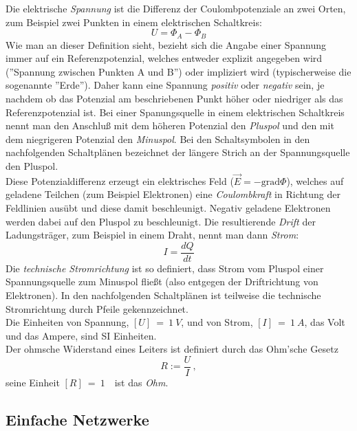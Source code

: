Die elektrische \textit{Spannung} ist die Differenz der Coulombpotenziale an zwei Orten, zum Beispiel zwei Punkten in einem elektrischen Schaltkreis:
\begin{equation}
	U = \Phi_A - \Phi_B
\end{equation}
Wie man an dieser Definition sieht, bezieht sich die Angabe einer Spannung immer auf ein Referenzpotenzial, welches entweder explizit angegeben wird (''Spannung zwischen Punkten A und B'') oder impliziert wird (typischerweise die sogenannte ''Erde''). Daher kann eine Spannung \textit{positiv} oder \textit{negativ} sein, je nachdem ob das Potenzial am beschriebenen Punkt höher oder niedriger als das Referenzpotenzial ist. Bei einer Spanungsquelle in einem elektrischen Schaltkreis nennt man den Anschluß mit dem höheren Potenzial den \textit{Pluspol} und den mit dem niegrigeren Potenzial den \textit{Minuspol}. Bei den Schaltsymbolen in den nachfolgenden Schaltplänen bezeichnet der längere Strich an der Spannungsquelle den Pluspol.\\
Diese Potenzialdifferenz erzeugt ein elektrisches Feld ($\vec{E} = -\mathrm{grad}\Phi$), welches auf geladene Teilchen (zum Beispiel Elektronen) eine \textit{Coulombkraft} in Richtung der Feldlinien ausübt und diese damit beschleunigt. Negativ geladene Elektronen werden dabei auf den Pluspol zu beschleunigt. Die resultierende \textit{Drift} der Ladungsträger, zum Beispiel in einem Draht, nennt man dann \textit{Strom}:
\begin{equation}
	I = \frac{dQ}{dt}
\end{equation}
Die \textit{technische Stromrichtung} ist so definiert, dass Strom vom Pluspol einer Spannungsquelle zum Minuspol fließt (also entgegen der Driftrichtung von Elektronen). In den nachfolgenden Schaltplänen ist teilweise die technische Stromrichtung durch Pfeile gekennzeichnet.\\

\noindent
Die Einheiten von Spannung, $[U]~=~1~V$, und von Strom, $[I]~=~1~A$, das Volt und das Ampere, sind SI Einheiten. \\

\noindent
Der ohmsche Widerstand eines Leiters ist definiert durch das Ohm'sche Gesetz
\begin{equation}
R:=\frac{U}{I}\, ,
\end{equation}
seine Einheit $[R]~=~1$~\Ohm\, ist das \textit{Ohm}.

\subsection{Einfache Netzwerke}

